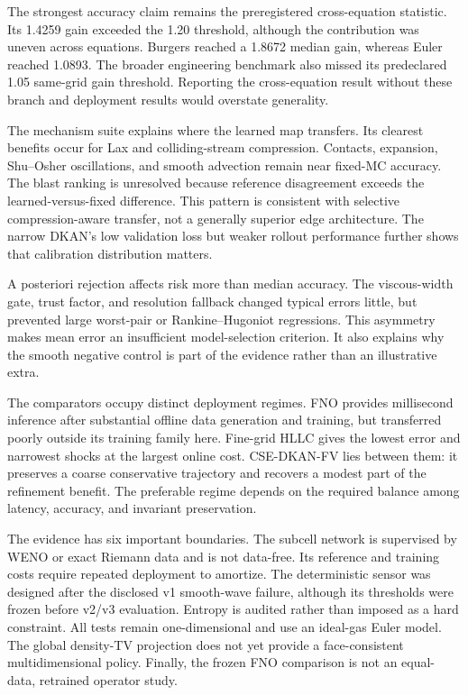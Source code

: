 \documentclass[10pt,twocolumn]{article}
\newcommand{\method}{CSE-DKAN-FV}
\begin{document}
The strongest accuracy claim remains the preregistered cross-equation statistic. Its 1.4259 gain exceeded the 1.20 threshold, although the contribution was uneven across equations. Burgers reached a 1.8672 median gain, whereas Euler reached 1.0893. The broader engineering benchmark also missed its predeclared 1.05 same-grid gain threshold. Reporting the cross-equation result without these branch and deployment results would overstate generality.

The mechanism suite explains where the learned map transfers. Its clearest benefits occur for Lax and colliding-stream compression. Contacts, expansion, Shu--Osher oscillations, and smooth advection remain near fixed-MC accuracy. The blast ranking is unresolved because reference disagreement exceeds the learned-versus-fixed difference. This pattern is consistent with selective compression-aware transfer, not a generally superior edge architecture. The narrow DKAN's low validation loss but weaker rollout performance further shows that calibration distribution matters.

A posteriori rejection affects risk more than median accuracy. The viscous-width gate, trust factor, and resolution fallback changed typical errors little, but prevented large worst-pair or Rankine--Hugoniot regressions. This asymmetry makes mean error an insufficient model-selection criterion. It also explains why the smooth negative control is part of the evidence rather than an illustrative extra.

The comparators occupy distinct deployment regimes. FNO provides millisecond inference after substantial offline data generation and training, but transferred poorly outside its training family here. Fine-grid HLLC gives the lowest error and narrowest shocks at the largest online cost. \method{} lies between them: it preserves a coarse conservative trajectory and recovers a modest part of the refinement benefit. The preferable regime depends on the required balance among latency, accuracy, and invariant preservation.

The evidence has six important boundaries. The subcell network is supervised by WENO or exact Riemann data and is not data-free. Its reference and training costs require repeated deployment to amortize. The deterministic sensor was designed after the disclosed v1 smooth-wave failure, although its thresholds were frozen before v2/v3 evaluation. Entropy is audited rather than imposed as a hard constraint. All tests remain one-dimensional and use an ideal-gas Euler model. The global density-TV projection does not yet provide a face-consistent multidimensional policy. Finally, the frozen FNO comparison is not an equal-data, retrained operator study.
\end{document}
